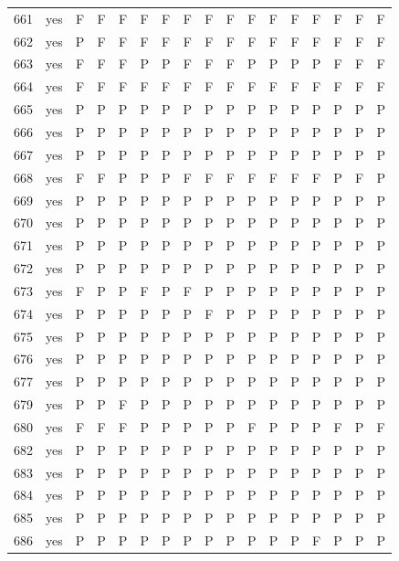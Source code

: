 \begin{table}[p]
\begin{tabular*}{\textwidth}{@{\extracolsep{\fill}}rcccccccccccccccc}
661 & yes & F & F & F & F & F & F & F & F & F & F & F & F & F & F & F\\
662 & yes & P & F & F & F & F & F & F & F & F & F & F & F & F & F & F\\
663 & yes & F & F & F & P & P & F & F & F & P & P & P & P & F & F & F\\
664 & yes & F & F & F & F & F & F & F & F & F & F & F & F & F & F & F\\
665 & yes & P & P & P & P & P & P & P & P & P & P & P & P & P & P & P\\
666 & yes & P & P & P & P & P & P & P & P & P & P & P & P & P & P & P\\
667 & yes & P & P & P & P & P & P & P & P & P & P & P & P & P & P & P\\
668 & yes & F & F & P & P & P & F & F & F & F & F & F & F & P & F & P\\
669 & yes & P & P & P & P & P & P & P & P & P & P & P & P & P & P & P\\
670 & yes & P & P & P & P & P & P & P & P & P & P & P & P & P & P & P\\
671 & yes & P & P & P & P & P & P & P & P & P & P & P & P & P & P & P\\
672 & yes & P & P & P & P & P & P & P & P & P & P & P & P & P & P & P\\
673 & yes & F & P & P & F & P & F & P & P & P & P & P & P & P & P & P\\
674 & yes & P & P & P & P & P & P & F & P & P & P & P & P & P & P & P\\
675 & yes & P & P & P & P & P & P & P & P & P & P & P & P & P & P & P\\
676 & yes & P & P & P & P & P & P & P & P & P & P & P & P & P & P & P\\
677 & yes & P & P & P & P & P & P & P & P & P & P & P & P & P & P & P\\
679 & yes & P & P & F & P & P & P & P & P & P & P & P & P & P & P & P\\
680 & yes & F & F & F & P & P & P & P & P & F & P & P & P & F & P & F\\
682 & yes & P & P & P & P & P & P & P & P & P & P & P & P & P & P & P\\
683 & yes & P & P & P & P & P & P & P & P & P & P & P & P & P & P & P\\
684 & yes & P & P & P & P & P & P & P & P & P & P & P & P & P & P & P\\
685 & yes & P & P & P & P & P & P & P & P & P & P & P & P & P & P & P\\
686 & yes & P & P & P & P & P & P & P & P & P & P & P & F & P & P & P\\
\bottomrule\end{tabular*}\end{table}
\clearpage

